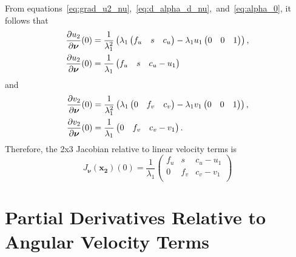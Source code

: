 From equations~\ref{eq:grad_u2_nu},~\ref{eq:d_alpha_d_nu},~and~\ref{eq:alpha_0},
it follows that
\begin{subequations}
\begin{align}
	\frac{\partial u_2}{\partial \bm{\nu}}(0)
		&= \frac{1}{\lambda_1^2} \left( \lambda_1 \begin{pmatrix} {f_u} & {s} & {c_u} \end{pmatrix}
			- \lambda_1 u_1 \begin{pmatrix} {0} & {0} & {1} \end{pmatrix} \right),\\
	\frac{\partial u_2}{\partial \bm{\nu}}(0)
		&= \frac{1}{\lambda_1} \begin{pmatrix} {f_u} & {s} & {c_u - u_1} \end{pmatrix} \label{eq:grad_u2_nu_0}
\end{align}
\end{subequations}
and
\begin{subequations}
\begin{align}
	\frac{\partial v_2}{\partial \bm{\nu}}(0)
		&= \frac{1}{\lambda_1^2} \left( \lambda_1 \begin{pmatrix} {0} & {f_v} & {c_v} \end{pmatrix}
			- \lambda_1 v_1 \begin{pmatrix} {0} & {0} & {1} \end{pmatrix} \right),\\
	\frac{\partial v_2}{\partial \bm{\nu}}(0)
		&= \frac{1}{\lambda_1} \begin{pmatrix} {0} & {f_v} & {c_v - v_1} \end{pmatrix}. \label{eq:grad_v2_nu_0}
\end{align}
\end{subequations}
Therefore, the 2x3 Jacobian relative to linear velocity terms is
\begin{equation}
\label{eq:jac_2x3_nu}
	\boxed{J_{\bm{\nu}}(\bm{x_2})(0) =
		\frac{1}{\lambda_1} \begin{pmatrix}
			f_u & s   & c_u - u_1 \\
			0   & f_v & c_v - v_1 \\
		\end{pmatrix}}
\end{equation}

\section{Partial Derivatives Relative to Angular Velocity Terms}%
\label{sec:partial_derivatives_relative_to_angular_velocity_terms}

